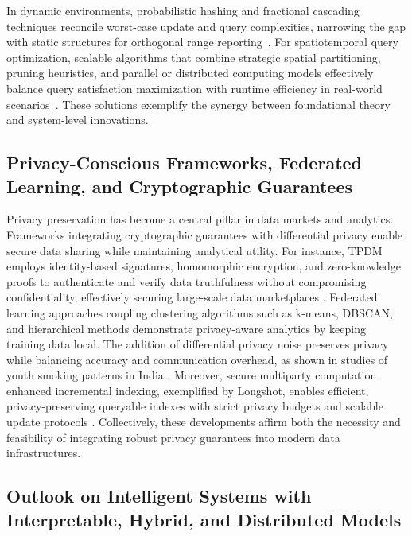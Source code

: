\documentclass[sigconf]{acmart}
\begin{document}
In dynamic environments, probabilistic hashing and fractional cascading techniques reconcile worst-case update and query complexities, narrowing the gap with static structures for orthogonal range reporting~\cite{ref4}. For spatiotemporal query optimization, scalable algorithms that combine strategic spatial partitioning, pruning heuristics, and parallel or distributed computing models effectively balance query satisfaction maximization with runtime efficiency in real-world scenarios~\cite{ref8}. These solutions exemplify the synergy between foundational theory and system-level innovations.

\subsection{Privacy-Conscious Frameworks, Federated Learning, and Cryptographic Guarantees}

Privacy preservation has become a central pillar in data markets and analytics. Frameworks integrating cryptographic guarantees with differential privacy enable secure data sharing while maintaining analytical utility. For instance, TPDM employs identity-based signatures, homomorphic encryption, and zero-knowledge proofs to authenticate and verify data truthfulness without compromising confidentiality, effectively securing large-scale data marketplaces \cite{ref28}. Federated learning approaches coupling clustering algorithms such as k-means, DBSCAN, and hierarchical methods demonstrate privacy-aware analytics by keeping training data local. The addition of differential privacy noise preserves privacy while balancing accuracy and communication overhead, as shown in studies of youth smoking patterns in India \cite{ref23}. Moreover, secure multiparty computation enhanced incremental indexing, exemplified by Longshot, enables efficient, privacy-preserving queryable indexes with strict privacy budgets and scalable update protocols \cite{ref31}. Collectively, these developments affirm both the necessity and feasibility of integrating robust privacy guarantees into modern data infrastructures.

\subsection{Outlook on Intelligent Systems with Interpretable, Hybrid, and Distributed Models}
\end{document}
